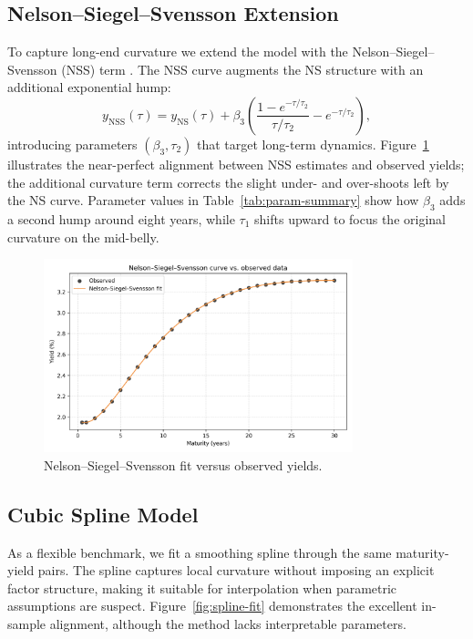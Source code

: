 \documentclass[12pt]{article}
\begin{document}
\subsection{Nelson--Siegel--Svensson Extension}
\begin{spacing}{1.15}
To capture long-end curvature we extend the model with the Nelson--Siegel--Svensson (NSS) term \parencite{diebold_li_2006, ecb_yield_curve_2018}. The NSS curve augments the NS structure with an additional exponential hump:
\begin{equation}
  y_{\text{NSS}}(\tau) = y_{\text{NS}}(\tau) + \beta_3 \left( \frac{1 - e^{-\tau/\tau_2}}{\tau/\tau_2} - e^{-\tau/\tau_2} \right),
\end{equation}
introducing parameters $(\beta_3, \tau_2)$ that target long-term dynamics. Figure~\ref{fig:nss-fit} illustrates the near-perfect alignment between NSS estimates and observed yields; the additional curvature term corrects the slight under- and over-shoots left by the NS curve. Parameter values in Table~\ref{tab:param-summary} show how $\beta_3$ adds a second hump around eight years, while $\tau_1$ shifts upward to focus the original curvature on the mid-belly.
\end{spacing}

\begin{figure}[htbp]
  \centering
  \includegraphics[width=0.8\textwidth]{../data/output/figure_nss_fit.png}
  \caption{Nelson--Siegel--Svensson fit versus observed yields.}
  \label{fig:nss-fit}
\end{figure}

\FloatBarrier
\subsection{Cubic Spline Model}
\begin{spacing}{1.15}
As a flexible benchmark, we fit a smoothing spline \parencite{cubic_spline_1989} through the same maturity-yield pairs. The spline captures local curvature without imposing an explicit factor structure, making it suitable for interpolation when parametric assumptions are suspect. Figure~\ref{fig:spline-fit} demonstrates the excellent in-sample alignment, although the method lacks interpretable parameters.
\end{spacing}
\end{document}
